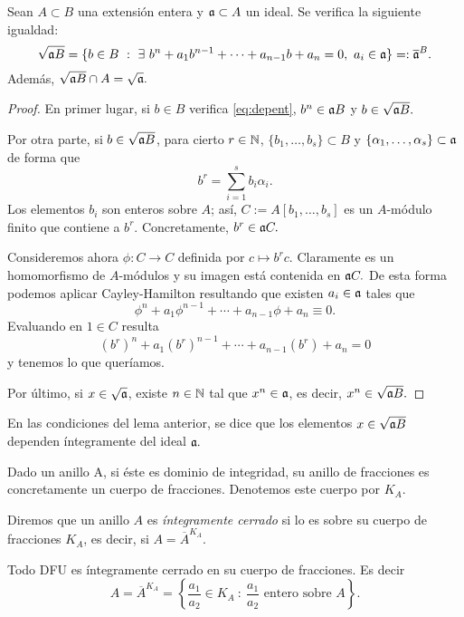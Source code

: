 \documentclass[../main.tex]{subfiles}
\begin{document}
\begin{lemma}\label{lemma:idext}
Sean $A\subset B$ una extensión entera y $\mathfrak{a}\subset A$ un ideal. Se verifica la siguiente igualdad:
$$\sqrt{\mathfrak{a} B}=\{b\in B\ :\ \exists\ b^n+a_1 b^{n-1}+\cdots+a_{n-1}b+a_n=0,\ a_i\in\mathfrak{a}\}=:\overline{\mathfrak{a}}^B.$$
Además, $\sqrt{\mathfrak{a} B}\cap A=\sqrt{\mathfrak{a}}.$
\end{lemma}
\begin{proof}
En primer lugar, si $b\in B$ verifica \ref{eq:depent}, $b^n\in\mathfrak{a} B$ y $b\in\sqrt{\mathfrak{a} B}.$

Por otra parte, si $b\in\sqrt{\mathfrak{a} B}$, para cierto $r\in\mathbb{N}$, $\{b_1,\dots,b_s\}\subset B$ y $\{\alpha_1,\dots,\alpha_s\}\subset\mathfrak{a}$ de forma que
$$b^r=\sum_{i=1}^sb_i\alpha_i.$$
Los elementos $b_i$ son enteros sobre $A$; así, $C:=A[b_1,\dots,b_s]$ es un $A$-módulo finito que contiene a $b^r.$ Concretamente, $b^r\in\mathfrak{a} C.$

Consideremos ahora $\phi: C\rightarrow C$ definida por $c\mapsto b^r c.$ Claramente es un homomorfismo de $A$-módulos y su imagen está contenida en $\mathfrak{a} C. $ De esta forma podemos aplicar Cayley-Hamilton resultando que existen $a_i\in\mathfrak{a}$ tales que
$$\phi^n+a_1\phi^{n-1}+\cdots+a_{n-1}\phi+a_n\equiv 0.$$
Evaluando en $1\in C$ resulta
$$(b^r)^n+a_1(b^r)^{n-1}+\cdots+a_{n-1}(b^r)+a_n= 0$$
y tenemos lo que queríamos.

Por último, si $x\in\sqrt{\mathfrak{a}}$, existe $n\in\mathbb{N}$ tal que $x^n\in\mathfrak{a}$, es decir, $x^n\in\sqrt{\mathfrak{a} B}.$
\end{proof}

\begin{definition}
En las condiciones del lema anterior, se dice que los elementos $x\in\sqrt{\mathfrak{a} B}$ dependen íntegramente del ideal $\mathfrak{a}.$
\end{definition}

Dado un anillo A, si éste es dominio de integridad, su anillo de fracciones es concretamente un cuerpo de fracciones. Denotemos este cuerpo por $K_A.$

\begin{definition}
Diremos que un anillo $A$ es \textit{íntegramente cerrado} si lo es sobre su cuerpo de fracciones $K_A$, es decir, si $A=\overline{A}^{K_A}.$
\end{definition}

\begin{lemma}
Todo DFU es íntegramente cerrado en su cuerpo de fracciones. Es decir
$$A=\overline{A}^{K_A}=\left\{\frac{a_1}{a_2}\in K_A\ :\ \frac{a_1}{a_2}\text{ entero sobre }A\right\}.$$
\end{lemma}
\end{document}

